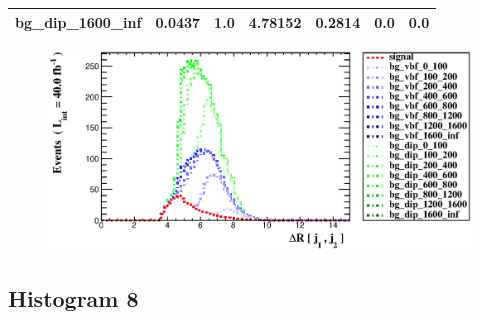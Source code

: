 \documentclass[a4paper, 10pt]{article}
\begin{document}
\begin{table}[H]
\begin{center}
\begin{tabular}{|m{23.0mm}|m{23.0mm}|m{18.0mm}|m{19.0mm}|m{19.0mm}|m{19.0mm}|m{19.0mm}|}
      \hline
      {\cellcolor{white}         bg\_dip\_1600\_inf}& {\cellcolor{white}         0.0437}& {\cellcolor{white}         1.0}& {\cellcolor{white}         4.78152}& {\cellcolor{white}         0.2814}& {\cellcolor{green}         0.0}& {\cellcolor{green}         0.0}\\
\hline
    \end{tabular}
  \end{center}
\end{table}

\begin{figure}[H]
  \begin{center}
    \includegraphics[scale=0.45]{selection_6.eps}\\
\caption{   }
  \end{center}
\end{figure}
      \newpage
\subsection{ Histogram 8}
\end{document}
